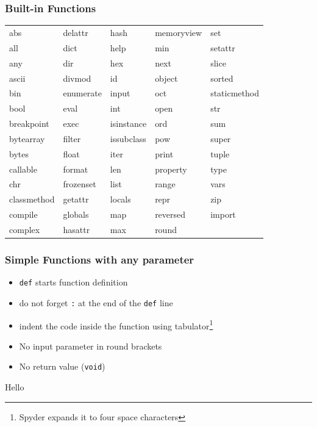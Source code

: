 \documentclass[english]{beamer}
\newcommand{\ta}[1]{\textattachfile[color=1 0 0]{#1}{Code}}
\begin{document}
\begin{frame}
\frametitle{Built-in Functions}

\begin{tabular}{lllll}
abs	&	delattr	&	hash	&	memoryview	&	set	\\
all	&	dict	&	help	&	min	&	setattr	\\
any	&	dir	&	hex	&	next	&	slice	\\
ascii	&	divmod	&	id	&	object	&	sorted	\\
bin	&	enumerate	&	input	&	oct	&	staticmethod	\\
bool	&	eval	&	int	&	open	&	str	\\
breakpoint	&	exec	&	isinstance	&	ord	&	sum	\\
bytearray	&	filter	&	issubclass	&	pow	&	super	\\
bytes	&	float	&	iter	&	print	&	tuple	\\
callable	&	format	&	len	&	property	&	type	\\
chr	&	frozenset	&	list	&	range	&	vars	\\
classmethod	&	getattr	&	locals	&	repr	&	zip	\\
compile	&	globals	&	map	&	reversed	&	\textunderscore \textunderscore import \textunderscore \textunderscore	\\
complex	&	hasattr	&	max	&	round	&		\\
\end{tabular}
\end{frame}


%
%
%
%
%


\begin{frame}[containsverbatim]
\frametitle{Simple Functions with any parameter}

\begin{itemize}
	\item \texttt{def} starts function definition
	\item do not forget \texttt{:} at the end of the \texttt{def} line
	\item indent the code inside the function using tabulator\footnote{Spyder expands it to four space characters}
	\item No input parameter in round brackets
	\item No return value (\texttt{void})
\end{itemize}



\begin{ausgabe}
Hello
\end{ausgabe}

\end{frame}
\end{document}

